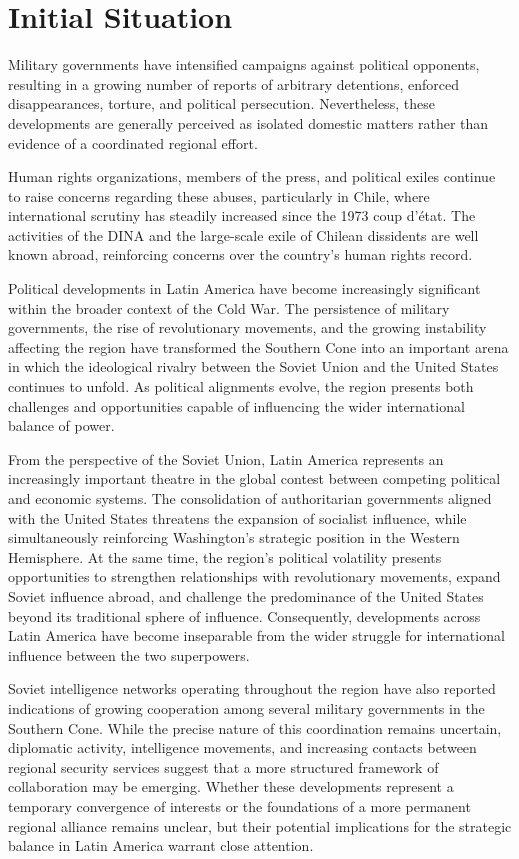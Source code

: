 \section{Initial Situation}


Military governments have intensified campaigns against political opponents, resulting in a growing number of reports of arbitrary detentions, enforced disappearances, torture, and political persecution. Nevertheless, these developments are generally perceived as isolated domestic matters rather than evidence of a coordinated regional effort.

Human rights organizations, members of the press, and political exiles continue to raise concerns regarding these abuses, particularly in Chile, where international scrutiny has steadily increased since the 1973 coup d’état. The activities of the DINA and the large-scale exile of Chilean dissidents are well known abroad, reinforcing concerns over the country’s human rights record.

Political developments in Latin America have become increasingly significant within the broader context of the Cold War. The persistence of military governments, the rise of revolutionary movements, and the growing instability affecting the region have transformed the Southern Cone into an important arena in which the ideological rivalry between the Soviet Union and the United States continues to unfold. As political alignments evolve, the region presents both challenges and opportunities capable of influencing the wider international balance of power.

From the perspective of the Soviet Union, Latin America represents an increasingly important theatre in the global contest between competing political and economic systems. The consolidation of authoritarian governments aligned with the United States threatens the expansion of socialist influence, while simultaneously reinforcing Washington's strategic position in the Western Hemisphere. At the same time, the region's political volatility presents opportunities to strengthen relationships with revolutionary movements, expand Soviet influence abroad, and challenge the predominance of the United States beyond its traditional sphere of influence. Consequently, developments across Latin America have become inseparable from the wider struggle for international influence between the two superpowers.

Soviet intelligence networks operating throughout the region have also reported indications of growing cooperation among several military governments in the Southern Cone. While the precise nature of this coordination remains uncertain, diplomatic activity, intelligence movements, and increasing contacts between regional security services suggest that a more structured framework of collaboration may be emerging. Whether these developments represent a temporary convergence of interests or the foundations of a more permanent regional alliance remains unclear, but their potential implications for the strategic balance in Latin America warrant close attention.
